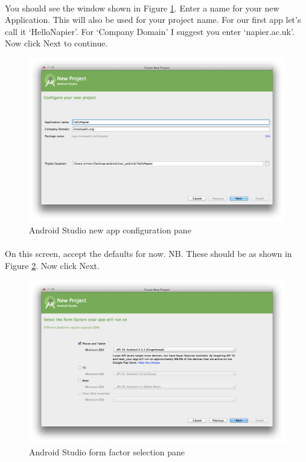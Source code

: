 \paragraph{} You should see the window shown in Figure \ref{fig:android.studio_config}. Enter a name for your new Application. This will also be used for your project name. For our first app let's call it `HelloNapier'. For `Company Domain' I suggest you enter `napier.ac.uk'. Now click Next to continue.

\begin{figure}[H]
\centering
\includegraphics[width=\textwidth]{images/android-studio_02_configure}
\caption{Android Studio new app configuration pane}
\label{fig:android.studio_config}
\end{figure}

\paragraph{} On this screen, accept the defaults for now. NB. These should be as shown in Figure \ref{fig:android.studio_form}. Now click Next.

\begin{figure}[H]
\centering
\includegraphics[width=\textwidth]{images/android-studio_03_form-factors}
\caption{Android Studio form factor selection pane}
\label{fig:android.studio_form}
\end{figure}

